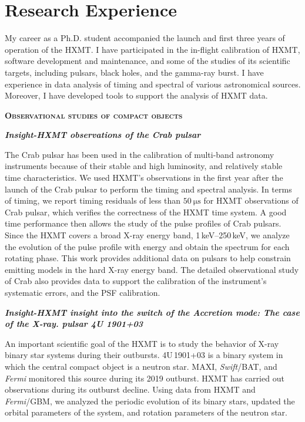 \documentclass[a4paper,12pt]{article}
\begin{document}
\newpage
\section{Research Experience}
\setlength{\parindent}{2em}
\hspace{2cm}\par
My career as a Ph.D. student accompanied the launch and first three years of operation of the HXMT. I have participated in the in-flight calibration of HXMT, software development and maintenance, and some of the studies of its scientific targets, including pulsars, black holes, and the gamma-ray burst. I have experience in data analysis of timing and spectral of various astronomical sources. Moreover, I have developed tools to support the analysis of HXMT data. 

\large\textbf{\textsc{Observational studies of compact objects}}
\normalsize

\textbf{\textit{Insight-HXMT observations of the Crab pulsar}}

The Crab pulsar has been used in the calibration of multi-band astronomy instruments because of their stable and high luminosity, and relatively stable time characteristics. We used HXMT's observations in the first year after the launch of the Crab pulsar to perform the timing and spectral analysis. In terms of timing, we report timing residuals of less than $\SI{50}{\us}$ for HXMT observations of Crab pulsar, which verifies the correctness of the HXMT time system. A good time performance then allows the study of the pulse profiles of Crab pulsars. Since the HXMT covers a broad X-ray energy band, 1\,keV--250\,keV, we analyze the evolution of the pulse profile with energy and obtain the spectrum for each rotating phase. This work provides additional data on pulsars to help constrain emitting models in the hard X-ray energy band. The detailed observational study of Crab also provides data to support the calibration of the instrument's systematic errors, and the PSF calibration.

\textbf{\emph{Insight-HXMT insight into the switch of the Accretion mode: The case of the X-ray. pulsar 4U 1901+03}}

An important scientific goal of the HXMT is to study the behavior of X-ray binary star systems during their outbursts. 4U\,1901+03 is a binary system in which the central compact object is a neutron star. MAXI, \textit{Swift}/BAT, and \textit{Fermi} monitored this source during its 2019 outburst. HXMT has carried out observations during its outburst decline. Using data from HXMT and \textit{Fermi}/GBM, we analyzed the periodic evolution of its binary stars, updated the orbital parameters of the system, and rotation parameters of the neutron star.
\end{document}
